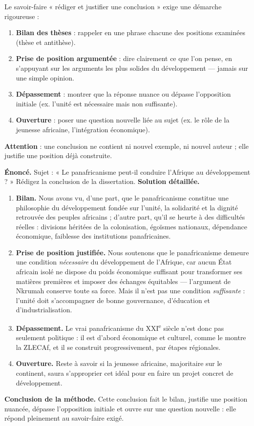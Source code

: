 \documentclass[11pt]{article}
\begin{document}
\begin{methode}
Le savoir-faire « rédiger et justifier une conclusion » exige une démarche rigoureuse :
\begin{enumerate}
\item \textbf{Bilan des thèses} : rappeler en une phrase chacune des positions examinées (thèse et antithèse).
\item \textbf{Prise de position argumentée} : dire clairement ce que l'on pense, en s'appuyant sur les arguments les plus solides du développement — jamais sur une simple opinion.
\item \textbf{Dépassement} : montrer que la réponse nuance ou dépasse l'opposition initiale (ex. l'unité est nécessaire mais non suffisante).
\item \textbf{Ouverture} : poser une question nouvelle liée au sujet (ex. le rôle de la jeunesse africaine, l'intégration économique).
\end{enumerate}
\textbf{Attention} : une conclusion ne contient ni nouvel exemple, ni nouvel auteur ; elle justifie une position déjà construite.
\end{methode}

\begin{exoresolu}
\textbf{Énoncé.} Sujet : « Le panafricanisme peut-il conduire l'Afrique au développement ? » Rédigez la conclusion de la dissertation.
\tcblower
\textbf{Solution détaillée.}
\begin{enumerate}
\item \textbf{Bilan.} Nous avons vu, d'une part, que le panafricanisme constitue une philosophie du développement fondée sur l'unité, la solidarité et la dignité retrouvée des peuples africains ; d'autre part, qu'il se heurte à des difficultés réelles : divisions héritées de la colonisation, égoïsmes nationaux, dépendance économique, faiblesse des institutions panafricaines.
\item \textbf{Prise de position justifiée.} Nous soutenons que le panafricanisme demeure une condition \emph{nécessaire} du développement de l'Afrique, car aucun État africain isolé ne dispose du poids économique suffisant pour transformer ses matières premières et imposer des échanges équitables — l'argument de Nkrumah conserve toute sa force. Mais il n'est pas une condition \emph{suffisante} : l'unité doit s'accompagner de bonne gouvernance, d'éducation et d'industrialisation.
\item \textbf{Dépassement.} Le vrai panafricanisme du XXI\textsuperscript{e} siècle n'est donc pas seulement politique : il est d'abord économique et culturel, comme le montre la ZLECAf, et il se construit progressivement, par étapes régionales.
\item \textbf{Ouverture.} Reste à savoir si la jeunesse africaine, majoritaire sur le continent, saura s'approprier cet idéal pour en faire un projet concret de développement.
\end{enumerate}
\textbf{Conclusion de la méthode.} Cette conclusion fait le bilan, justifie une position nuancée, dépasse l'opposition initiale et ouvre sur une question nouvelle : elle répond pleinement au savoir-faire exigé.
\end{exoresolu}
\end{document}
